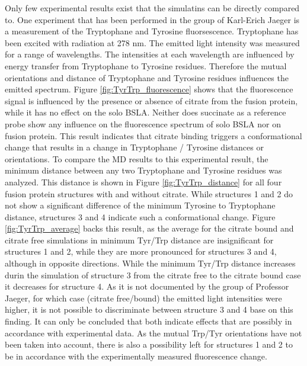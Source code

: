 \documentclass[english, a4paper, 12pt, titlepage, draft]{article}
\begin{document}
Only few experimental results exist that the simulatins can be directly compared to. 
One experiment that has been performed in the group of Karl-Erich Jaeger is a measurement of the Tryptophane and Tyrosine fluorsescence.
Tryptophane has been excited with radiation at 278 nm.
The emitted light intensity was measured for a range of wavelengths.
The intensities at each wavelength are influenced by energy transfer from Tryptophane to Tyrosine residues.
Therefore the mutual orientations and distance of Tryptophane and Tyrosine residues influences the emitted spectrum.
Figure \ref{fig:TyrTrp_fluorescence} shows that the fluorescence signal is influenced by the presence or absence of citrate from the fusion protein, while it has no effect on the solo BSLA.
Neither does succinate as a reference probe show any influence on the fluorescence spectrum of solo BSLA nor on fusion protein.
This result indicates that citrate binding triggers a conformational change that results in a change in Tryptophane / Tyrosine distances or orientations.
To compare the MD results to this experimental result, the minimum distance between any two Tryptophane and Tyrosine residues was analyzed.
This distance is shown in Figure \ref{fig:TyrTrp_distance} for all four fusion protein structures with and without citrate.
While structures 1 and 2 do not show a significant difference of the minimum Tyrosine to Tryptophane distance, structures 3 and 4 indicate such a conformational change.
Figure \ref{fig:TyrTrp_average} backs this result, as the average for the citrate bound and citrate free simulations in minimum Tyr/Trp distance are insignificant for structures 1 and 2, while they are more pronounced for structures 3 and 4, although in opposite directions.
While the minimum Tyr/Trp distance increases durin the simulation of structure 3 from the citrate free to the citrate bound case it decreases for structure 4.
As it is not documented by the group of Professor Jaeger, for which case (citrate free/bound) the emitted light intensities were higher, it is not possible to discriminate between structure 3 and 4 base on this finding.
It can only be concluded that both indicate effects that are possibly in accordance with experimental data.
As the mutual Trp/Tyr orientations have not been taken into account, there is also a possibility left for structures 1 and 2 to be in accordance with the experimentally measured fluorescence change.

 
\end{document}
